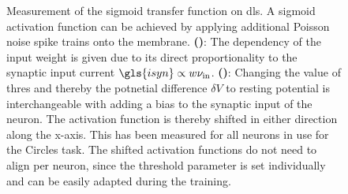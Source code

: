 \begin{figure}
	\begin{subfigure}[c]{0.5\textwidth}
		\centering
		\caption{}
		
		\label{dlsactivationfunctionweight}
	\end{subfigure}	
	\begin{subfigure}[c]{0.5\textwidth}
		\centering
		\caption{}
		
		\label{dlsactivationfunctionbias}
	\end{subfigure}
	\caption[Measurement of the sigmoid transfer function on \gls{dls}]{Measurement of the sigmoid transfer function on \gls{dls}. A sigmoid activation function can be achieved by applying additional Poisson noise spike trains onto the membrane. \textbf{()}: The dependency of the input weight is given due to its direct proportionality to the synaptic input current $\gls{isyn} \propto w \nu_\text{in}$. \textbf{()}: Changing the value of \gls{thres} and thereby the potnetial difference $\delta V$ to resting potential is interchangeable with adding a bias to the synaptic input of the neuron. The activation function is thereby shifted in either direction along the x-axis. This has been measured for all neurons in use for the Circles task. The shifted activation functions do not need to align per neuron, since the threshold parameter is set individually and can be easily adapted during the training.}
\end{figure}
%
%		




